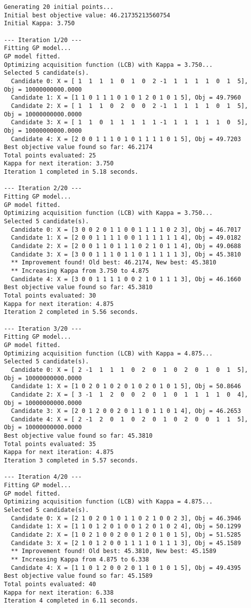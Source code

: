 \documentclass[
  letterpaper,
  DIV=11,
  numbers=noendperiod]{scrartcl}
\begin{document}
\begin{verbatim}
Generating 20 initial points...
Initial best objective value: 46.21735213560754
Initial Kappa: 3.750

--- Iteration 1/20 ---
Fitting GP model...
GP model fitted.
Optimizing acquisition function (LCB) with Kappa = 3.750...
Selected 5 candidate(s).
  Candidate 0: X = [ 1  1  1  1  0  1  0  2 -1  1  1  1  1  0  1  5], Obj = 10000000000.0000
  Candidate 1: X = [1 1 0 1 1 1 0 1 0 1 2 0 1 0 1 5], Obj = 49.7960
  Candidate 2: X = [ 1  1  1  0  2  0  0  2 -1  1  1  1  1  0  1  5], Obj = 10000000000.0000
  Candidate 3: X = [ 1  1  0  1  1  1  1  1 -1  1  1  1  1  1  0  5], Obj = 10000000000.0000
  Candidate 4: X = [2 0 0 1 1 1 0 1 0 1 1 1 1 0 1 5], Obj = 49.7203
Best objective value found so far: 46.2174
Total points evaluated: 25
Kappa for next iteration: 3.750
Iteration 1 completed in 5.18 seconds.

--- Iteration 2/20 ---
Fitting GP model...
GP model fitted.
Optimizing acquisition function (LCB) with Kappa = 3.750...
Selected 5 candidate(s).
  Candidate 0: X = [3 0 0 2 0 1 1 0 0 1 1 1 1 0 2 3], Obj = 46.7017
  Candidate 1: X = [2 0 0 1 1 1 1 0 0 1 1 1 1 1 1 4], Obj = 49.0182
  Candidate 2: X = [2 0 0 1 1 0 1 1 1 0 2 1 0 1 1 4], Obj = 49.0688
  Candidate 3: X = [3 0 0 1 1 1 0 1 1 0 1 1 1 1 1 3], Obj = 45.3810
  ** Improvement found! Old best: 46.2174, New best: 45.3810
  ** Increasing Kappa from 3.750 to 4.875
  Candidate 4: X = [3 0 0 1 1 1 1 0 0 2 1 0 1 1 1 3], Obj = 46.1660
Best objective value found so far: 45.3810
Total points evaluated: 30
Kappa for next iteration: 4.875
Iteration 2 completed in 5.56 seconds.

--- Iteration 3/20 ---
Fitting GP model...
GP model fitted.
Optimizing acquisition function (LCB) with Kappa = 4.875...
Selected 5 candidate(s).
  Candidate 0: X = [ 2 -1  1  1  1  0  2  0  1  0  2  0  1  0  1  5], Obj = 10000000000.0000
  Candidate 1: X = [1 0 2 0 1 0 2 0 1 0 2 0 1 0 1 5], Obj = 50.8646
  Candidate 2: X = [ 3 -1  1  2  0  0  2  0  1  0  1  1  1  1  0  4], Obj = 10000000000.0000
  Candidate 3: X = [2 0 1 2 0 0 2 0 1 1 0 1 1 0 1 4], Obj = 46.2653
  Candidate 4: X = [ 2 -1  2  0  1  0  2  0  1  0  2  0  0  1  1  5], Obj = 10000000000.0000
Best objective value found so far: 45.3810
Total points evaluated: 35
Kappa for next iteration: 4.875
Iteration 3 completed in 5.57 seconds.

--- Iteration 4/20 ---
Fitting GP model...
GP model fitted.
Optimizing acquisition function (LCB) with Kappa = 4.875...
Selected 5 candidate(s).
  Candidate 0: X = [2 1 0 2 0 1 0 1 1 0 2 1 0 0 2 3], Obj = 46.3946
  Candidate 1: X = [1 1 0 1 2 0 1 0 0 1 2 0 1 0 2 4], Obj = 50.1299
  Candidate 2: X = [1 0 2 1 0 0 2 0 0 1 2 0 1 0 1 5], Obj = 51.5285
  Candidate 3: X = [2 1 0 1 2 0 0 1 1 1 1 0 1 1 1 3], Obj = 45.1589
  ** Improvement found! Old best: 45.3810, New best: 45.1589
  ** Increasing Kappa from 4.875 to 6.338
  Candidate 4: X = [1 1 0 1 2 0 0 2 0 1 1 0 1 0 1 5], Obj = 49.4395
Best objective value found so far: 45.1589
Total points evaluated: 40
Kappa for next iteration: 6.338
Iteration 4 completed in 6.11 seconds.


\end{verbatim}
\end{document}
